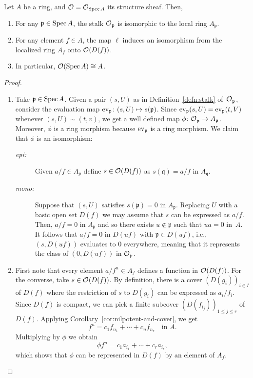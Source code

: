 \begin{thm}\label{thm:structure-fibers}
    Let\/ $A$ be a ring, and\/ $\mathcal O_{}=\mathcal O_{\operatorname{Spec} A}$ its structure sheaf. Then,
    \begin{enumerate}[\rm a)]
        \item For any\/ $\mathfrak p\in \operatorname{Spec} A$, the stalk\/ ${\mathcal O_{}}_{\mathfrak p}$ is isomorphic to the local ring\/ $A_{\mathfrak p}$.
        \item For any element\/ $f \in A$, the map\/ $\ell$ induces an isomorphism from the localized ring\/ $A_f$ onto\/ $\mathcal O_{}(D(f))$.
        \item In particular, ${\mathcal O_{}}(\operatorname{Spec} A)\cong A$.
    \end{enumerate}
\end{thm}

\begin{proof}${}$
    \begin{enumerate}[\rm a)]
        \item Take $\mathfrak p\in\operatorname{Spec} A$. Given a pair $(s,U)$ as in Definition~\ref{defn:stalk} of~${\mathcal O_{}}_{\mathfrak p}$, consider the evaluation map $\operatorname{ev}_{\mathfrak p}\colon(s,U)\mapsto s(\mathfrak p)$. Since $\operatorname{ev}_{\mathfrak p}(s,U)=\operatorname{ev}_{\mathfrak p}(t,V)$ whenever $(s,U)\sim(t,v)$, we get a well defined map $\phi\colon{\mathcal O_{}}_{\mathfrak p}\to A_{\mathfrak p}$. Moreover, $\phi$ is a ring morphism because $\operatorname{ev}_{\mathfrak p}$ is a ring morphism. We claim that $\phi$ is an isomorphism:
        \begin{description}
            \item[\rm\textit{epi:}] Given $a/f\in A_p$ define $s\in{\mathcal O_{}}(D(f))$ as $s(\mathfrak q)=a/f$ in $A_{\mathfrak q}$.
            \item[\rm\textit{mono:}] Suppose that $(s,U)$ satisfies $s(\mathfrak p)=0$ in $A_{\mathfrak p}$. Replacing $U$ with a basic open set $D(f)$ we may assume that $s$ can be expressed as $a/f$. Then, $a/f=0$ in $A_{\mathfrak p}$ and so there exists $u\notin\mathfrak p$ such that $ua=0$ in~$A$. It follows that $a/f=0$ in $D(uf)$ with $\mathfrak p\in D(uf)$, i.e., $(s,D(uf))$ evaluates to $0$ everywhere, meaning that it represents the class of $(0,D(uf))$ in ${\mathcal O_{}}_{\mathfrak p}$.
        \end{description}

        \item First note that every element $a/f^n\in A_f$ defines a function in ${\mathcal O_{}}(D(f))$. For the converse, take $s\in{\mathcal O_{}}(D(f))$. By definition, there is a cover $(D(g_i))_{i\in I}$ of $D(f)$ where the restriction of $s$ to $D(g_i)$ can be expressed as $a_i/f_i$. Since $D(f)$ is compact, we can pick a finite subcover $(D(f_{i_j}))_{1\le j\le r}$ of $D(f)$. Applying Corollary~\ref{cor:nilpotent-and-cover}, we get
        $$
            f^n = c_1f_{n_1}+\cdots+c_nf_{n_r}\quad\text{in }A.
        $$
        Multiplying by $\phi$ we obtain
        $$
            \phi f^n=c_1a_{i_1}+\cdots+c_ra_{i_r},
        $$
        which shows that $\phi$ can be represented in $D(f)$ by an element of $A_f$.


\end{enumerate}
\end{proof}
